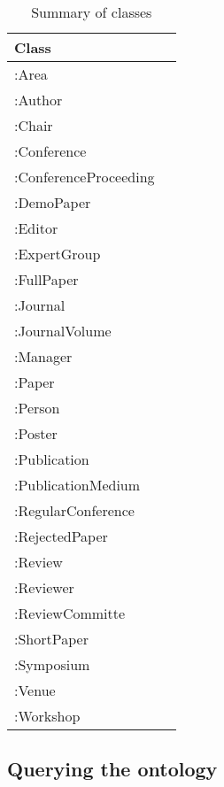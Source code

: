 \begin{table}[H]
\centering
\caption{Summary of classes}
\label{tab:summary}
\begin{tabular}{lr}
  \toprule
  Class\\
  \midrule
  :Area\\
  :Author\\
  :Chair\\
  :Conference\\
  :ConferenceProceeding\\
  :DemoPaper\\
  :Editor\\
  :ExpertGroup\\
  :FullPaper\\
  :Journal\\
  :JournalVolume\\
  :Manager\\
  :Paper\\
  :Person\\
  :Poster\\
  :Publication\\
  :PublicationMedium\\
  :RegularConference\\
  :RejectedPaper\\
  :Review\\
  :Reviewer\\
  :ReviewCommitte\\
  :ShortPaper\\
  :Symposium\\
  :Venue\\
  :Workshop\\
  \bottomrule
\end{tabular}
\end{table}

\pagebreak
\subsection{Querying the ontology}%
\label{sub:querying}


